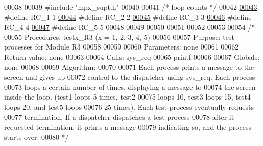 \begin{DoxyCode}
00038 
00039 \textcolor{preprocessor}{#include "mpx\_supt.h"}
00040 
00041 \textcolor{comment}{/* loop counts */}
00042 
\hypertarget{procs-r3_8c_source_l00043}{}\hyperlink{procs-r3_8c_a69bb368d802d94815d8480c1196eb868}{00043} \textcolor{preprocessor}{#define RC\_1 1}
\hypertarget{procs-r3_8c_source_l00044}{}\hyperlink{procs-r3_8c_aecb625779f85a782d04475c4fb74ebc5}{00044} \textcolor{preprocessor}{}\textcolor{preprocessor}{#define RC\_2 2}
\hypertarget{procs-r3_8c_source_l00045}{}\hyperlink{procs-r3_8c_acf180d856b90414b8bed369054fcd763}{00045} \textcolor{preprocessor}{}\textcolor{preprocessor}{#define RC\_3 3}
\hypertarget{procs-r3_8c_source_l00046}{}\hyperlink{procs-r3_8c_ac76d64b147c7d9537915e51c7dc02bc1}{00046} \textcolor{preprocessor}{}\textcolor{preprocessor}{#define RC\_4 4}
\hypertarget{procs-r3_8c_source_l00047}{}\hyperlink{procs-r3_8c_acba6a931785dc419ad6337bc9c1a24f8}{00047} \textcolor{preprocessor}{}\textcolor{preprocessor}{#define RC\_5 5}
00048 \textcolor{preprocessor}{}
00049 
00050 
00051 
00052 
00053 
00054 \textcolor{comment}{/*}
00055 \textcolor{comment}{        Procedures: testx\_R3 (x = 1, 2, 3, 4, 5)}
00056 \textcolor{comment}{}
00057 \textcolor{comment}{        Purpose: test processes for Module R3}
00058 \textcolor{comment}{}
00059 \textcolor{comment}{}
00060 \textcolor{comment}{        Parameters: none        }
00061 \textcolor{comment}{}
00062 \textcolor{comment}{        Return value: none}
00063 \textcolor{comment}{}
00064 \textcolor{comment}{        Calls:  sys\_req}
00065 \textcolor{comment}{                printf}
00066 \textcolor{comment}{}
00067 \textcolor{comment}{        Globals: none}
00068 \textcolor{comment}{}
00069 \textcolor{comment}{        Algorithm:}
00070 \textcolor{comment}{}
00071 \textcolor{comment}{           Each process prints a message to the screen and gives up}
00072 \textcolor{comment}{           control to the dispatcher using sys\_req.  Each process}
00073 \textcolor{comment}{           loops a certain number of times, displaying a message to}
00074 \textcolor{comment}{           the screen inside the loop.  (test1 loops 5 times, test2}
00075 \textcolor{comment}{           loops 10, test3 loops 15, test4 loops 20, and test5 loops}
00076 \textcolor{comment}{           25 times).  Each test process eventually requests}
00077 \textcolor{comment}{           termination.  If a dispatcher dispatches a test process}
00078 \textcolor{comment}{           after it requested termination, it prints a message}
00079 \textcolor{comment}{           indicating so, and the process starts over.}
00080 \textcolor{comment}{*/}

\end{DoxyCode}
